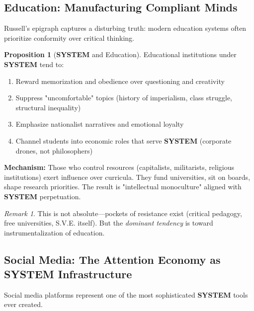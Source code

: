 \documentclass[11pt,a4paper]{article}
\newcommand{\SYSTEM}{\textbf{SYSTEM}}
\theoremstyle{definition}
\newtheorem{proposition}{Proposition}[section]
\theoremstyle{remark}
\newtheorem{remark}{Remark}[section]
\begin{document}
\subsection{Education: Manufacturing Compliant Minds}

Russell's epigraph captures a disturbing truth: modern education systems often prioritize conformity over critical thinking.

\begin{proposition}[\SYSTEM{} and Education]
\label{prop:education}
Educational institutions under \SYSTEM{} tend to:
\begin{enumerate}
\item Reward memorization and obedience over questioning and creativity
\item Suppress "uncomfortable" topics (history of imperialism, class struggle, structural inequality)
\item Emphasize nationalist narratives and emotional loyalty
\item Channel students into economic roles that serve \SYSTEM{} (corporate drones, not philosophers)
\end{enumerate}

\textbf{Mechanism:} Those who control resources (capitalists, militarists, religious institutions) exert influence over curricula. They fund universities, sit on boards, shape research priorities. The result is "intellectual monoculture" aligned with \SYSTEM{} perpetuation.
\end{proposition}

\begin{remark}
This is not absolute—pockets of resistance exist (critical pedagogy, free universities, S.V.E. itself). But the \textit{dominant tendency} is toward instrumentalization of education.
\end{remark}

\subsection{Social Media: The Attention Economy as \SYSTEM{} Infrastructure}

Social media platforms represent one of the most sophisticated \SYSTEM{} tools ever created.
\end{document}
